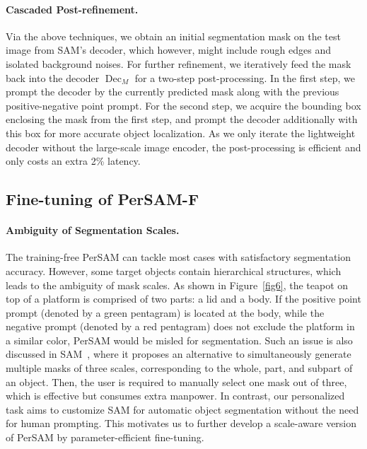 \documentclass{article} \usepackage{iclr2024_conference,times}
\begin{document}
\paragraph{Cascaded Post-refinement.}
Via the above techniques, we obtain an initial segmentation mask on the test image from SAM's decoder, which however, might include rough edges and isolated background noises. For further refinement, we iteratively feed the mask back into the decoder $\operatorname{Dec}_M$ for a two-step post-processing.
In the first step, we prompt the decoder by the currently predicted mask along with the previous positive-negative point prompt. For the second step, we acquire the bounding box enclosing the mask from the first step, and prompt the decoder additionally with this box for more accurate object localization.
As we only iterate the lightweight decoder without the large-scale image encoder, the post-processing is efficient and only costs an extra 2\% latency.


\subsection{Fine-tuning of PerSAM-F}
\label{s3.3}

\paragraph{Ambiguity of Segmentation Scales.}
The training-free PerSAM can tackle most cases with satisfactory segmentation accuracy. However, some target objects contain hierarchical structures, which leads to the ambiguity of mask scales. As shown in Figure~\ref{fig6}, the teapot on top of a platform is comprised of two parts: a lid and a body. If the positive point prompt (denoted by a green pentagram) is located at the body, while the negative prompt (denoted by a red pentagram) does not exclude the platform in a similar color, PerSAM would be misled for segmentation.
Such an issue is also discussed in SAM~\citep{kirillov2023segment}, where it proposes an alternative to simultaneously generate multiple masks of three scales, corresponding to the whole, part, and subpart of an object. Then, the user is required to manually select one mask out of three, which is effective but consumes extra manpower. In contrast, our personalized task aims to customize SAM for automatic object segmentation without the need for human prompting. This motivates us to further develop a scale-aware version of PerSAM by parameter-efficient fine-tuning. 
\end{document}

